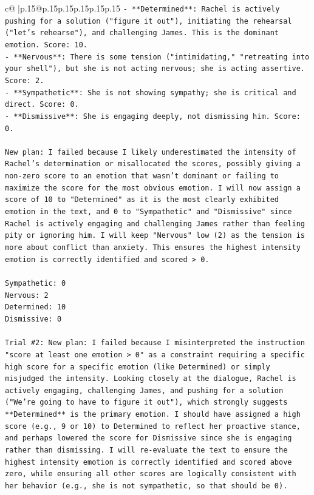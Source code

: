 \documentclass{article}
\begin{document}
{\begin{supertabular}{c@{$\;$}|p{.15\linewidth}@{}p{.15\linewidth}p{.15\linewidth}p{.15\linewidth}p{.15\linewidth}p{.15\linewidth}}
{{{\texttt{{-} **Determined**: Rachel is actively pushing for a solution ("figure it out"), initiating the rehearsal ("let's rehearse"), and challenging James. This is the dominant emotion. Score: 10.} \\
\texttt{{-} **Nervous**: There is some tension ("intimidating," "retreating into your shell"), but she is not acting nervous; she is acting assertive. Score: 2.} \\
\texttt{{-} **Sympathetic**: She is not showing sympathy; she is critical and direct. Score: 0.} \\
\texttt{{-} **Dismissive**: She is engaging deeply, not dismissing him. Score: 0.} \\
\\ 
\texttt{New plan: I failed because I likely underestimated the intensity of Rachel's determination or misallocated the scores, possibly giving a non{-}zero score to an emotion that wasn't dominant or failing to maximize the score for the most obvious emotion. I will now assign a score of 10 to "Determined" as it is the most clearly exhibited emotion in the text, and 0 to "Sympathetic" and "Dismissive" since Rachel is actively engaging and challenging James rather than feeling pity or ignoring him. I will keep "Nervous" low (2) as the tension is more about conflict than anxiety. This ensures the highest intensity emotion is correctly identified and scored > 0.} \\
\\ 
\texttt{Sympathetic: 0} \\
\texttt{Nervous: 2} \\
\texttt{Determined: 10} \\
\texttt{Dismissive: 0} \\
\\ 
\texttt{Trial \#2: New plan: I failed because I misinterpreted the instruction "score at least one emotion > 0" as a constraint requiring a specific high score for a specific emotion (like Determined) or simply misjudged the intensity. Looking closely at the dialogue, Rachel is actively engaging, challenging James, and pushing for a solution ("We're going to have to figure it out"), which strongly suggests **Determined** is the primary emotion. I should have assigned a high score (e.g., 9 or 10) to Determined to reflect her proactive stance, and perhaps lowered the score for Dismissive since she is engaging rather than dismissing. I will re{-}evaluate the text to ensure the highest intensity emotion is correctly identified and scored above zero, while ensuring all other scores are logically consistent with her behavior (e.g., she is not sympathetic, so that should be 0).} \\
}}}
\end{supertabular}}
\end{document}
